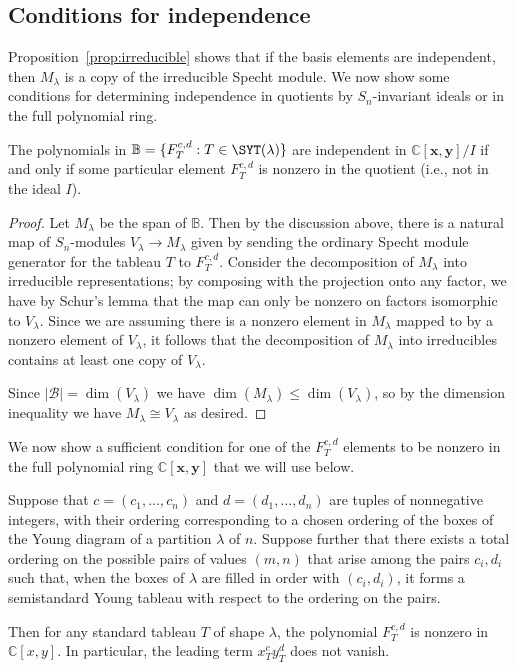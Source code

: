 \subsection{Conditions for independence}

Proposition~\ref{prop:irreducible} shows that if the basis elements are independent, then $M_\lambda$ is a copy of the irreducible Specht module.  We now show some conditions for determining independence in quotients by $S_n$-invariant ideals or in the full polynomial ring. 

\begin{prop}\label{prop:nonzero}
	The polynomials in $\mathbb{B}=\{F_T^{c,d}:T\in \SYT(\lambda)\}$ are independent in $\mathbb{C}[\mathbf{x},\mathbf{y}]/I$ if and only if some particular element $F_T^{c,d}$ is nonzero in the quotient (i.e., not in the ideal $I$).  
\end{prop}

\begin{proof}
	Let $M_\lambda$ be the span of $\mathbb{B}$.  Then by the discussion above, there is a natural map of $S_n$-modules $V_\lambda\to M_\lambda$ given by sending the ordinary Specht module generator for the tableau $T$ to $F_T^{c,d}$.  Consider the decomposition of $M_\lambda$ into irreducible representations; by composing with the projection onto any factor, we have by Schur's lemma that the map can only be nonzero on factors isomorphic to $V_\lambda$.  Since we are assuming there is a nonzero element in $M_\lambda$ mapped to by a nonzero element of $V_\lambda$, it follows that the decomposition of $M_\lambda$ into irreducibles contains at least one copy of $V_\lambda$.
	
	Since $|\mathcal{B}|=\dim(V_\lambda)$ we have $\dim(M_\lambda)\le \dim(V_\lambda)$, so by the dimension inequality we have $M_\lambda\cong V_\lambda$ as desired.
\end{proof}

We now show a sufficient condition for one of the $F_T^{c,d}$ elements to be nonzero in the full polynomial ring $\mathbb{C}[\mathbf{x},\mathbf{y}]$ that we will use below.

\begin{prop}\label{prop:SSYT-values}
	Suppose that $c=(c_1,\ldots,c_n)$ and $d=(d_1,\ldots,d_n)$ are tuples of nonnegative integers, with their ordering corresponding to a chosen ordering of the boxes of the Young diagram of a partition $\lambda$ of $n$.  Suppose further that there exists a total ordering on the possible pairs of values $(m,n)$ that arise among the pairs $c_i,d_i$ such that, when the boxes of $\lambda$ are filled in order with $(c_i,d_i)$, it forms a semistandard Young tableau with respect to the ordering on the pairs.
	
	Then for any standard tableau $T$ of shape $\lambda$, the polynomial $F_{T}^{c,d}$ is nonzero in $\mathbb{C}[x,y]$.  In particular, the leading term $x_T^cy_T^d$ does not vanish.
\end{prop}

